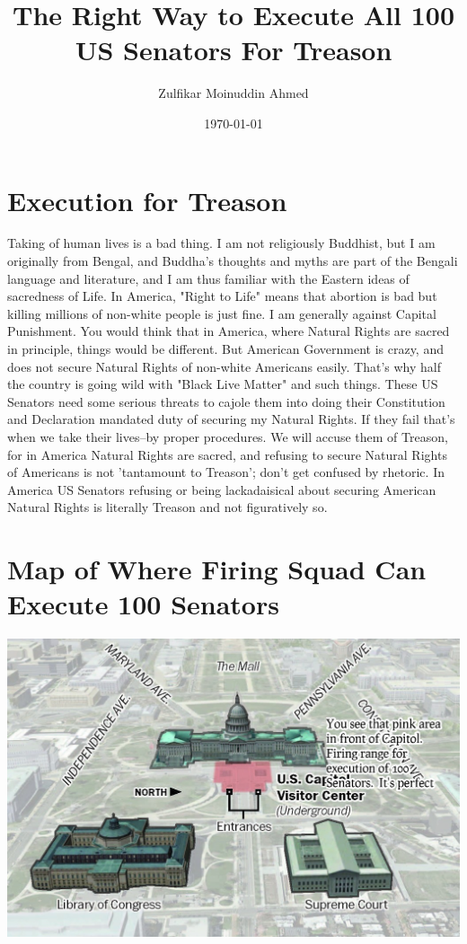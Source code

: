 \documentclass{amsart}
\title{The Right Way to Execute All 100 US Senators For Treason}
\author{Zulfikar Moinuddin Ahmed}
\date{\today}
\begin{document}
\maketitle

\section{Execution for Treason}

Taking of human lives is a bad thing.  I am not religiously Buddhist, but I am originally from Bengal, and Buddha's thoughts and myths are part of the Bengali language and literature, and I am thus familiar with the Eastern ideas of sacredness of Life.  In America, "Right to Life" means that abortion is bad but killing millions of non-white people is just fine.  I am generally against Capital Punishment.  You would think that in America, where Natural Rights are sacred in principle, things would be different.  But American Government is crazy, and does not secure Natural Rights of non-white Americans easily.  That's why half the country is going wild with "Black Live Matter" and such things.  These US Senators need some serious threats to cajole them into doing their Constitution and Declaration mandated duty of securing my Natural Rights.  If they fail that's when we take their lives--by proper procedures.  We will accuse them of Treason, for in America Natural Rights are sacred, and refusing to secure Natural Rights of Americans is not 'tantamount to Treason'; don't get confused by rhetoric.  In America US Senators refusing or being lackadaisical about securing American Natural Rights is literally Treason and not figuratively so.

\section{Map of Where Firing Squad Can Execute 100 Senators}

\includegraphics[angle=0,scale=0.15]{firing.jpg}
\end{document}

